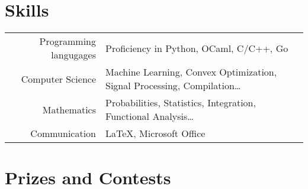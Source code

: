 \documentclass[a4paper,10pt]{article} %
\begin{document}





\section{Skills}

\begin{tabular}{rl}
  Programming langugages & Proficiency in Python, OCaml, C/C++, Go \\
  Computer Science & Machine Learning, Convex Optimization, Signal Processing, Compilation\ldots \\
  Mathematics & Probabilities, Statistics, Integration, Functional Analysis\ldots \\
  Communication & \LaTeX, Microsoft Office

\end{tabular}

\section{Prizes and Contests}
\end{document}
